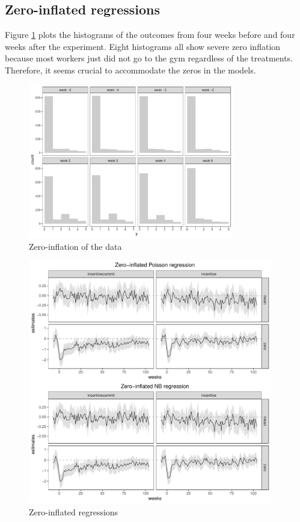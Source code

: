 \subsection{Zero-inflated regressions}


Figure \ref{fig::zeroinflation-gym} plots the histograms of the outcomes from four weeks before and four weeks after the experiment. Eight histograms all show severe zero inflation because most workers just did not go to the gym regardless of the treatments. Therefore, it seems crucial to accommodate the zeros in the models. 

\begin{figure}[ht]
\centering
\includegraphics[width = 0.8\textwidth]{figures/gym_check_zeroinf.pdf}
\caption{Zero-inflation of the data}\label{fig::zeroinflation-gym}
\end{figure}


\begin{figure}[ht]
\centering
\includegraphics[width = 0.95\textwidth]{figures/gym_zeroinflated_regressions.pdf}
\caption{Zero-inflated regressions}\label{fig::zeroinflated-regressions-gym}
\end{figure}


